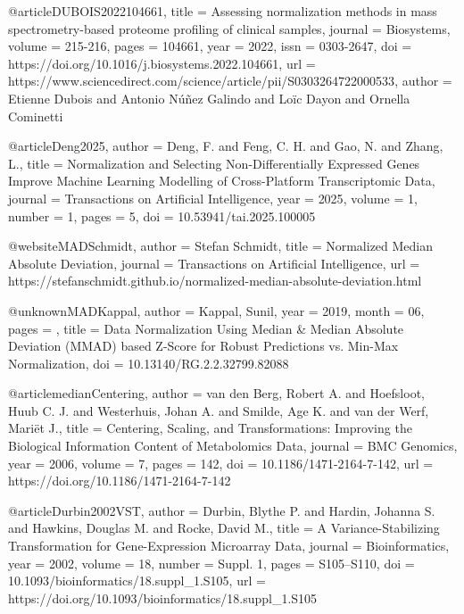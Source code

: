 @article{DUBOIS2022104661,
title = {Assessing normalization methods in mass spectrometry-based proteome profiling of clinical samples},
journal = {Biosystems},
volume = {215-216},
pages = {104661},
year = {2022},
issn = {0303-2647},
doi = {https://doi.org/10.1016/j.biosystems.2022.104661},
url = {https://www.sciencedirect.com/science/article/pii/S0303264722000533},
author = {Etienne Dubois and Antonio Núñez Galindo and Loïc Dayon and Ornella Cominetti}
}

@article{Deng2025,
  author  = {Deng, F. and Feng, C. H. and Gao, N. and Zhang, L.},
  title   = {Normalization and Selecting Non-Differentially Expressed Genes Improve Machine Learning Modelling of Cross-Platform Transcriptomic Data},
  journal = {Transactions on Artificial Intelligence},
  year    = {2025},
  volume  = {1},
  number  = {1},
  pages   = {5},
  doi     = {10.53941/tai.2025.100005}
}

@website{MADSchmidt,
  author  = {Stefan Schmidt},
  title   = {Normalized Median Absolute Deviation},
  journal = {Transactions on Artificial Intelligence},
  url    =  {https://stefanschmidt.github.io/normalized-median-absolute-deviation.html}
}

@unknown{MADKappal,
author = {Kappal, Sunil},
year = {2019},
month = {06},
pages = {},
title = {Data Normalization Using Median & Median Absolute Deviation (MMAD) based Z-Score for Robust Predictions vs. Min-Max Normalization},
doi = {10.13140/RG.2.2.32799.82088}
}

@article{medianCentering,
  author    = {van den Berg, Robert A. and Hoefsloot, Huub C. J. and Westerhuis, Johan A. and Smilde, Age K. and van der Werf, Mari{\"e}t J.},
  title     = {Centering, Scaling, and Transformations: Improving the Biological Information Content of Metabolomics Data},
  journal   = {BMC Genomics},
  year      = {2006},
  volume    = {7},
  pages      = {142},
  doi       = {10.1186/1471-2164-7-142},
  url       = {https://doi.org/10.1186/1471-2164-7-142}
}

@article{Durbin2002VST,
  author  = {Durbin, Blythe P. and Hardin, Johanna S. and Hawkins, Douglas M. and Rocke, David M.},
  title   = {A Variance-Stabilizing Transformation for Gene-Expression Microarray Data},
  journal = {Bioinformatics},
  year    = {2002},
  volume  = {18},
  number  = {Suppl. 1},
  pages   = {S105--S110},
  doi     = {10.1093/bioinformatics/18.suppl_1.S105},
  url     = {https://doi.org/10.1093/bioinformatics/18.suppl_1.S105}
}
